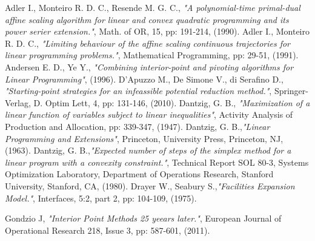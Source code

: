\documentclass[a4paper,10 pt,titlepage,twoside]{book}
\theoremstyle{plain}
\theoremstyle{definition}
\theoremstyle{remark}
\begin{document}
\begin{thebibliography}{9}
	
	
	 Adler I., Monteiro R. D. C., Resende M. G. C., \emph{ "A polynomial-time primal-dual affine scaling algorithm for linear and convex quadratic programming and its power serier extension."}, Math. of OR, 15, pp: 191-214, (1990).
	 Adler I., Monteiro R. D. C., \emph{ "Limiting behaviour of the affine scaling continuous trajectories for linear programming problems."}, Mathematical Programming, pp: 29-51, (1991).
	 Andersen E. D., Ye Y.,  \textit{"Combining interior-point and pivoting algorithms for Linear Programming"}, (1996).
	 D'Apuzzo M., De Simone V., di Serafino D., \emph{ "Starting-point strategies for an infeassible potential reduction method."}, Springer-Verlag, D. Optim Lett, 4, pp: 131-146, (2010).
	Dantzig, G. B.,\textit{ "Maximization of a linear function of variables subject to linear
	inequalities"}, Activity Analysis of Production and Allocation, pp: 339-347, (1947).
	Dantzig, G. B.,\emph{\;"Linear Programming and Extensions"}, Princeton, University Press, Princeton, NJ, (1963).	
	Dantzig, G. B.,\emph{\;"Expected number of steps of the simplex method for a linear program with a convexity constraint."}, Technical Report SOL 80-3, Systems Optimization Laboratory, Department of Operations Research, Stanford University, Stanford, CA, (1980).
	Drayer W., Seabury S.,\emph{\;"Facilities Expansion Model."}, Interfaces, 5:2, part 2, pp: 104-109, (1975).
	
	
	 Gondzio J, \textit{ "Interior Point Methods 25 yeears later."}, European Journal of Operational Research 218, Issue 3, pp: 587-601, (2011).	
	

\end{thebibliography}
\end{document}
